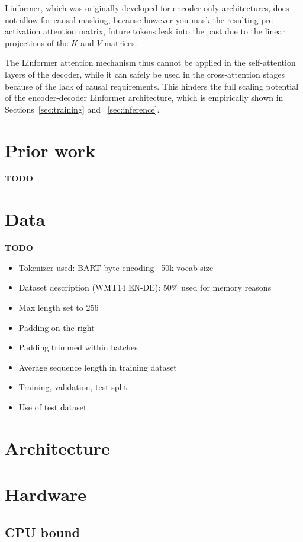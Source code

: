 \documentclass[titlepage]{article}
\begin{document}
Linformer, which was originally developed for encoder-only architectures, does not allow for causal masking, because however you mask the resulting pre-activation attention matrix, future tokens leak into the past due to the linear projections of the $K$ and $V$ matrices.

The Linformer attention mechanism thus cannot be applied in the self-attention layers of the decoder, while it can safely be used in the cross-attention stages because of the lack of causal requirements. This hinders the full scaling potential of the encoder-decoder Linformer architecture, which is empirically shown in Sections~\ref{sec:training} and ~\ref{sec:inference}.


\section{Prior work}
\textbf{TODO}

\section{Data}

\textbf{TODO}

\begin{itemize}
  \item Tokenizer used: BART byte-encoding ~50k vocab size
  \item Dataset description (WMT14 EN-DE): 50\% used for memory reasons
  \item Max length set to 256
  \item Padding on the right
  \item Padding trimmed within batches
  \item Average sequence length in training dataset
  \item Training, validation, test split
  \item Use of test dataset
\end{itemize}


\section{Architecture}

\section{Hardware}
\subsection{CPU bound}
\end{document}
